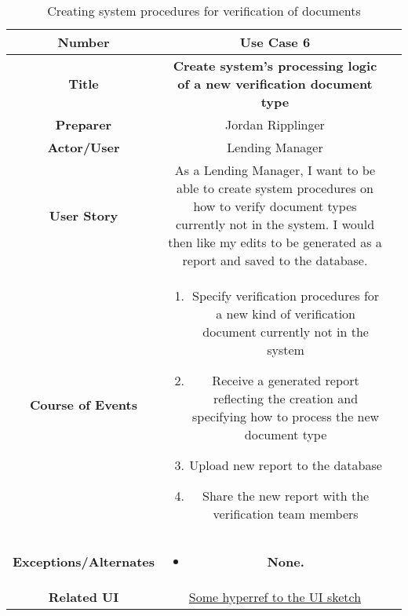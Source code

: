 \begin{table}[H]
    \centering
    \begin{tabularx}{0.75\linewidth}{||Sc|X||}
        \hline
        \hline
        \textbf{Number} & \textbf{Use Case 6} \\
        \hline
        \textbf{Title} & \textbf{Create system's processing logic of a new verification document type}\\
        \hline
        \textbf{Preparer} & Jordan Ripplinger \\
        \hline
        \textbf{Actor/User} & Lending Manager \\
        \hline
        \textbf{User Story} &
        As a Lending Manager, I want to be able to create system procedures on how to verify document types currently not in the system. I would then like my edits to be generated as a report and saved to the database. \\
        \hline
        \textbf{Course of Events} &
        \begin{minipage}[l]{\linewidth}
            \begin{enumerate}[wide, labelindent=0pt]
                \item Specify verification procedures for a new kind of verification document currently not in the system
                \item Receive a generated report reflecting the creation and specifying how to process the new document type
                \item Upload new report to the database
                \item Share the new report with the verification team members
            \end{enumerate}
            \vspace{4pt}
        \end{minipage} \\
        \hline
        \textbf{Exceptions/Alternates} & 
        \begin{minipage}[l]{\linewidth}
            \vspace{2pt}
            \begin{itemize}[wide, labelindent=0pt]
                \item \textbf{None.}
            \end{itemize}
        \end{minipage} \\
        \hline
        \textbf{Related UI} & \hyperref[templatesec]{Some hyperref to the UI sketch} \\
        \hline
        \hline
    \end{tabularx}
    \caption{Creating system procedures for verification of documents}
    \label{tab:use_case_create_sys_procedures}
\end{table}

